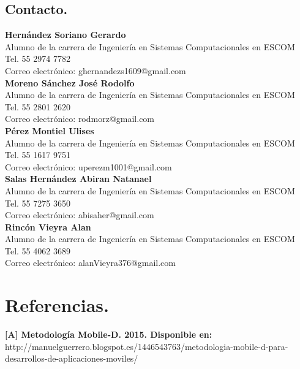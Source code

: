 \documentclass[10pt]{article}
\begin{document}
\subsection{Contacto.}

\textbf{Hernández Soriano Gerardo}\\
Alumno de la carrera de Ingeniería en Sistemas Computacionales en ESCOM\\
Tel. 55 2974 7782\\
Correo electrónico: ghernandezs1609@gmail.com\\

\textbf{Moreno Sánchez José Rodolfo} \\
Alumno de la carrera de Ingeniería en Sistemas Computacionales en ESCOM\\
Tel. 55 2801 2620 \\
Correo electrónico: rodmorz@gmail.com \\

\textbf{Pérez Montiel Ulises} \\
Alumno de la carrera de Ingeniería en Sistemas Computacionales en ESCOM\\
Tel. 55 1617 9751 \\
Correo electrónico: uperezm1001@gmail.com\\

\textbf{Salas Hernández Abiran Natanael}\\
Alumno de la carrera de Ingeniería en Sistemas Computacionales en ESCOM\\
Tel. 55 7275 3650\\
Correo electrónico: abisaher@gmail.com\\

\textbf{Rincón Vieyra Alan}\\
Alumno de la carrera de Ingeniería en Sistemas Computacionales en ESCOM\\
Tel. 55 4062 3689\\
Correo electrónico: alanVieyra376@gmail.com

\section{Referencias.}
\textbf{[A] Metodología Mobile-D. 2015. Disponible en:}\\ http://manuelguerrero.blogspot.es/1446543763/metodologia-mobile-d-para-desarrollos-de-aplicaciones-moviles/
\end{document}
